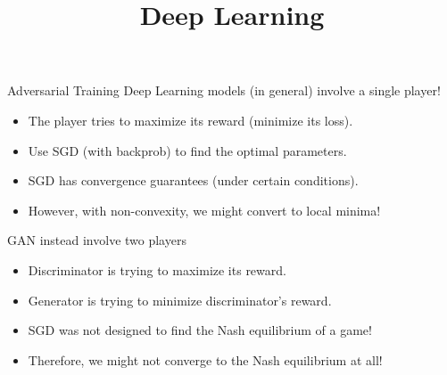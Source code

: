 




\title{Deep Learning}

\date{}


\newcommand{\titlefigure}{plots/illus_conv_two.png}
\newcommand{\learninggoals}{
  \item (no) convergence to fix point 
  \item problems of adversarial setting
}





%

%


\begin{frame} {Adversarial Training}  
  \vspace{2mm}
Deep Learning models (in general) involve a single player!
  \vspace{1mm}
  \begin{itemize}
    \item The player tries to maximize its reward (minimize its loss).
    \item Use SGD (with backprob) to find the optimal parameters.
    \item SGD has convergence guarantees (under certain conditions).
    \item However, with non-convexity, we might convert to local minima!
  \end{itemize}
    \vspace{3mm} 
GAN instead involve two players
     \vspace{1mm}
  \begin{itemize}
    \item Discriminator is trying to maximize its reward.
    \item Generator is trying to minimize discriminator's reward.
    \item  SGD was not designed to find the Nash equilibrium of a game!
    \item Therefore, we might not converge to the Nash equilibrium at all!
  \end{itemize}
  \vspace{2mm}
      
 \end{frame}
 

